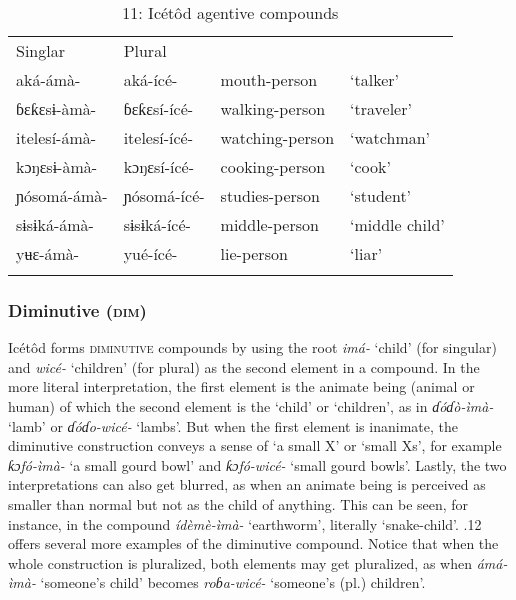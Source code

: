 \begin{table}
\caption{11: Icétôd agentive compounds}
\label{tab:4}


\begin{tabularx}{\textwidth}{XXXX}
\lsptoprule

Singlar & Plural &  & \\
aká-ámà- & aká-ícé- & mouth-person & ‘talker’\\
ɓɛƙɛsɨ-àmà- & ɓɛƙɛsí-ícé- & walking-person & ‘traveler’\\
itelesí-ámà- & itelesí-ícé- & watching-person & ‘watchman’\\
kɔŋɛsɨ-àmà- & kɔŋɛsí-ícé- & cooking-person & ‘cook’\\
ɲósomá-ámà- & ɲósomá-ícé- & studies-person & ‘student’\\
sɨsɨká-ámà- & sɨsɨká-ícé- & middle-person & ‘middle child’\\
yʉɛ-ámà- & yué-ícé- & lie-person & ‘liar’\\
\lspbottomrule
\end{tabularx}
\end{table}

\subsubsection{Diminutive (\textsc{dim})}

Icétôd forms \textsc{diminutive} compounds by using the root \textit{imá-} ‘child’ (for singular) and \textit{wicé-} ‘children’ (for plural) as the second element in a compound. In the more literal interpretation, the first element is the animate being (animal or human) of which the second element is the ‘child’ or ‘children’, as in \textit{ɗóɗò-ìmà-} ‘lamb’ or \textit{ɗóɗo-wicé-} ‘lambs’. But when the first element is inanimate, the diminutive construction conveys a sense of ‘a small X’ or ‘small Xs’, for example \textit{ƙɔfó-ìmà-} ‘a small gourd bowl’ and \textit{ƙɔfó-wicé-} ‘small gourd bowls’. Lastly, the two interpretations can also get blurred, as when an animate being is perceived as smaller than normal but not as the child of anything. This can be seen, for instance, in the compound \textit{ídèmè-ìmà-} ‘earthworm’, literally ‘snake-child’. .12 offers several more examples of the diminutive compound. Notice that when the whole construction is pluralized, both elements may get pluralized, as when \textit{ámá-ìmà-} ‘someone’s child’ becomes \textit{roɓa-wicé-} ‘someone’s (pl.) children’.


